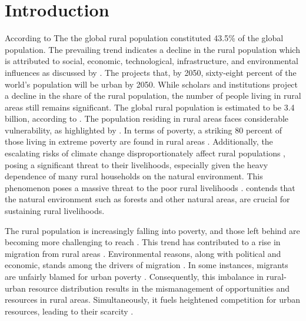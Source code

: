 \section{Introduction}\label{isect1}
According to The \cite{world2018rural} the global rural population constituted 43.5\% 
of the global population. The prevailing trend indicates a decline in the rural population which is attributed to social, economic, technological, infrastructure, and environmental influences as discussed by \citep{jaszczak2018phenomenon}. The \cite{UNDP} projects that, by 2050, sixty-eight percent of the world’s population will be urban by 2050.
While scholars and institutions project a decline in the share of the rural population, the number of people living in rural areas still remains significant. The global rural population is estimated to be 3.4 billion, according to \cite{Worldbank2022}. The population residing in rural areas faces considerable vulnerability, as highlighted by \cite{acharya2008dimension}.  In terms of poverty, a striking 80 percent of those living in extreme poverty are found in rural areas \citep{world2021state}. Additionally, the escalating risks of climate change disproportionately affect rural populations \citep{Researchoverview2022}, posing a significant threat to their livelihoods, especially given the heavy dependence of many rural households on the natural environment. This phenomenon poses a massive threat to the poor rural livelihoods \citep{pelser2022climate}. \cite{angelsen2014environmental} contends that the natural environment such as forests and other natural areas, are crucial for sustaining rural livelihoods.\par

The rural population is increasingly falling into poverty, and those left behind are becoming more challenging to reach \citep{UN2019}. This trend has contributed to a rise in migration from rural areas \citep{lazarte2017understanding}. Environmental reasons, along with political and economic, stands among the drivers of migration \citep{mcnamara2016insecure}. In some instances, migrants are unfairly blamed for urban poverty \citep{tacoli2015rural}. Consequently, this imbalance in rural-urban resource distribution results in the mismanagement of opportunities and resources in rural areas. Simultaneously, it fuels heightened competition for urban resources, leading to their scarcity \citep{artuso2011state}. \par

